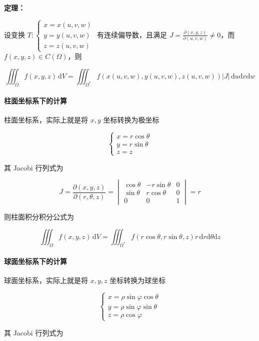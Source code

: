 \documentclass[lang = zh , final , oneside , openany , titlepage , zihao = -4 , linespread = 1.3 , baselineskip = false , cjk-font = windows , text-font = newtx , math-font = newtx]{sjtureport}
\begin{document}
\textbf{定理：}

设变换 \(T:\begin{cases}x = x(u,v,w)\\y = y(u,v,w)\\z = z(u,v,w)\end{cases}\) 有连续偏导数，且满足 \(J = \frac{\partial (x,y,z)}{\partial (u,v,w)}\neq 0\)，而 \(f(x,y,z)\in C(\Omega)\)，则

\[
\iiint_\Omega f(x,y,z)\,\mathrm{d}V = \iiint_{\Omega^*} f(x(u,v,w),y(u,v,w),z(u,v,w))\left\vert J \right\vert \,\mathrm{d}u\mathrm{d}v\mathrm{d}w
\]

\paragraph{柱面坐标系下的计算}

柱面坐标系，实际上就是将 \(x,y\) 坐标转换为极坐标

\[
\begin{cases}
x = r\cos\theta\\
y = r\sin\theta\\
z = z
\end{cases}
\]

其 Jacobi 行列式为

\[
J = \frac{\partial (x,y,z)}{\partial (r,\theta,z)} = \begin{vmatrix}
\cos\theta & -r\sin\theta & 0\\
\sin\theta & r\cos\theta & 0\\
0 & 0 & 1 
\end{vmatrix} = r
\]

则柱面积分积分公式为

\[
\iiint_\Omega f(x,y,z)\,\mathrm{d}V = \iiint_{\Omega^*} f(r\cos\theta,r\sin\theta,z)r\,\mathrm{d}r\mathrm{d}\theta\mathrm{d}z
\]

\paragraph{球面坐标系下的计算}

球面坐标系，实际上就是将 \(x,y,z\) 坐标转换为球坐标

\[
\begin{cases}
x = \rho\sin\varphi\cos\theta\\
y = \rho\sin\varphi\sin\theta\\
z = \rho\cos\varphi
\end{cases}
\]

其 Jacobi 行列式为
\end{document}
